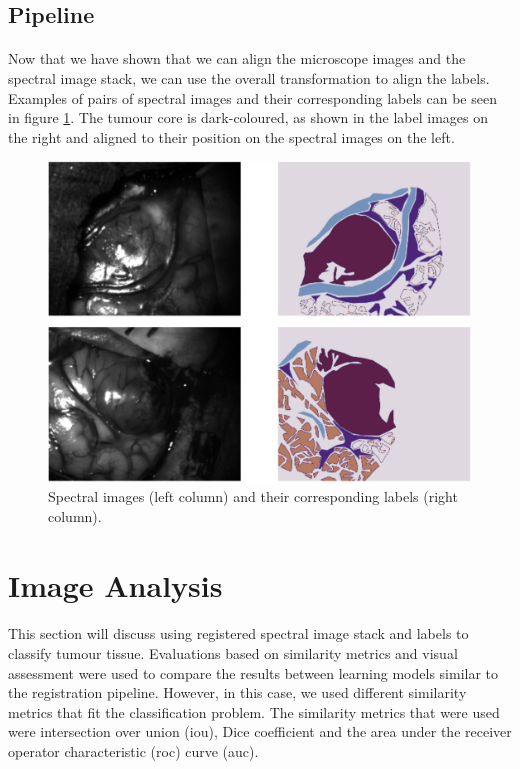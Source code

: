 \documentclass[12pt,oneside]{report}
\begin{document}
\subsection{Pipeline}
\paragraph{}
Now that we have shown that we can align the microscope images and the spectral image stack, we can use the overall transformation to align the labels. Examples of pairs of spectral images and their corresponding labels can be seen in figure \ref{fig:reg-label}. The tumour core is dark-coloured, as shown in the label images on the right and aligned to their position on the spectral images on the left.

\begin{figure}[h]
\centering
\begin{minipage}[h]{\textwidth}
    \centering
    \includegraphics[width=\textwidth]{figures/reg-label.png}
    \caption{Spectral images (left column) and their corresponding labels (right column).}
    \label{fig:reg-label}
\end{minipage}
\end{figure}


\section{Image Analysis}
\paragraph{}
This section will discuss using registered spectral image stack and labels to classify tumour tissue. Evaluations based on similarity metrics and visual assessment were used to compare the results between learning models similar to the registration pipeline. However, in this case, we used different similarity metrics that fit the classification problem. The similarity metrics that were used were intersection over union (\acrshort{iou}), Dice coefficient \cite{dice_measures_1945} and the area under the receiver operator characteristic (\acrshort{roc}) curve (\acrshort{auc}).
\end{document}
